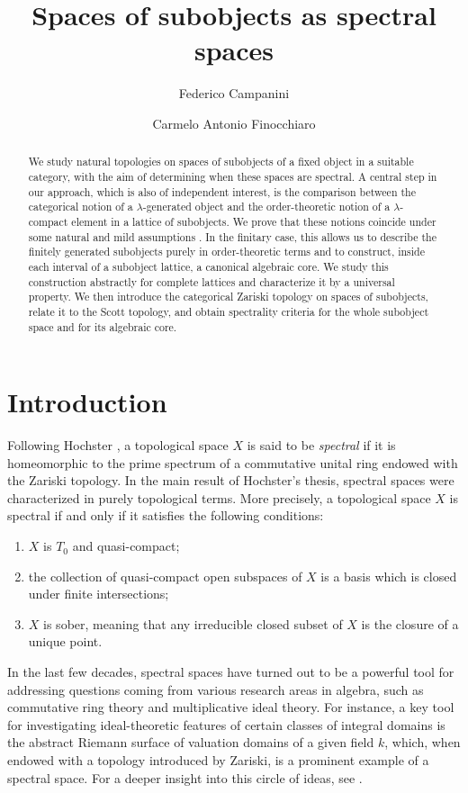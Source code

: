\documentclass{amsproc}
\title{Spaces of subobjects as spectral spaces}
\author[F. Campanini]{Federico Campanini}
\author[C. A. Finocchiaro]{Carmelo Antonio Finocchiaro}
\theoremstyle{definition}
\theoremstyle{plain}
\theoremstyle{remark}
\numberwithin{equation}{section}
\begin{document}
\begin{abstract}
We study natural topologies on spaces of subobjects of a fixed object in a suitable category, with the aim of determining when these spaces are spectral. A central step in our approach, which is also of independent interest, is the comparison between the categorical notion of a $\lambda$-generated object and the order-theoretic notion of a $\lambda$-compact element in a lattice of subobjects. We prove that these notions coincide under some natural and mild assumptions . In the finitary case, this allows us to describe the finitely generated subobjects purely in order-theoretic terms and to construct, inside each interval of a subobject lattice, a canonical algebraic core. We study this construction abstractly for complete lattices and characterize it by a universal property. We then introduce the categorical Zariski topology on spaces of subobjects, relate it to the Scott topology, and obtain spectrality criteria for the whole subobject space and for its algebraic core.
\end{abstract}

\maketitle

\section{Introduction}


Following Hochster \cite{hochster_spectral}, a topological space $X$ is said to be {\em spectral} if it is homeomorphic to the prime spectrum of a commutative unital ring endowed with the Zariski topology. In the main result of Hochster's thesis, spectral spaces were characterized in purely topological terms. More precisely, a topological space $X$ is spectral if and only if it satisfies the following conditions:
\begin{enumerate}
    \item
    $X$ is $T_0$ and quasi-compact;
    \item
    the collection of quasi-compact open subspaces of $X$ is a basis which is closed under finite intersections;
    \item
    $X$ is sober, meaning that any irreducible closed subset of $X$ is the closure of a unique point.
\end{enumerate}

In the last few decades, spectral spaces have turned out to be a powerful tool for addressing questions coming from various research areas in algebra, such as commutative ring theory and multiplicative ideal theory. For instance, a key tool for investigating ideal-theoretic features of certain classes of integral domains is the abstract Riemann surface of valuation domains of a given field $k$, which, when endowed with a topology introduced by Zariski, is a prominent example of a spectral space. For a deeper insight into this circle of ideas, see \cite{fifolo_transactions}.
\end{document}
